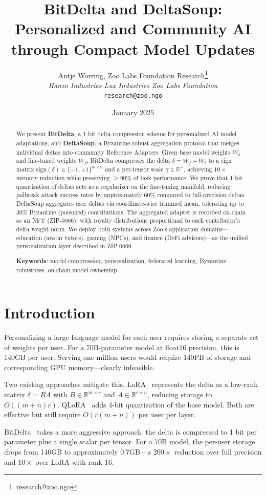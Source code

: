 \documentclass[11pt,letterpaper]{article}
\title{\textbf{BitDelta and DeltaSoup: Personalized and Community AI\\through Compact Model Updates}}
\author{
Antje Worring, Zoo Labs Foundation Research\thanks{research@zoo.ngo}\\
\textit{Hanzo Industries \quad Lux Industries \quad Zoo Labs Foundation}\\
\texttt{research@zoo.ngo}
}
\date{January 2025}
\newcommand{\R}{\mathbb{R}}
\begin{document}
\zoocoverpage

\begin{abstract}
We present \textbf{BitDelta}, a 1-bit delta compression scheme for personalized AI model adaptations, and \textbf{DeltaSoup}, a Byzantine-robust aggregation protocol that merges individual deltas into community Reference Adapters. Given base model weights $W_b$ and fine-tuned weights $W_f$, BitDelta compresses the delta $\delta = W_f - W_b$ to a sign matrix $\text{sign}(\delta) \in \{-1, +1\}^{m \times n}$ and a per-tensor scale $\gamma \in \R^+$, achieving $10\times$ memory reduction while preserving $\geq 90\%$ of task performance. We prove that 1-bit quantization of deltas acts as a regularizer on the fine-tuning manifold, reducing jailbreak attack success rates by approximately 60\% compared to full-precision deltas. DeltaSoup aggregates user deltas via coordinate-wise trimmed mean, tolerating up to 30\% Byzantine (poisoned) contributions. The aggregated adapter is recorded on-chain as an NFT (ZIP-0006), with royalty distributions proportional to each contributor's delta weight norm. We deploy both systems across Zoo's application domains---education (avatar tutors), gaming (NPCs), and finance (DeFi advisors)---as the unified personalization layer described in ZIP-0009.

\textbf{Keywords}: model compression, personalization, federated learning, Byzantine robustness, on-chain model ownership
\end{abstract}

\section{Introduction}

Personalizing a large language model for each user requires storing a separate set of weights per user. For a 70B-parameter model at float16 precision, this is 140GB per user. Serving one million users would require 140PB of storage and corresponding GPU memory---clearly infeasible.

Two existing approaches mitigate this. LoRA~\cite{hu2022lora} represents the delta as a low-rank matrix $\delta = BA$ with $B \in \R^{m \times r}$ and $A \in \R^{r \times n}$, reducing storage to $O((m+n)r)$. QLoRA~\cite{dettmers2024qlora} adds 4-bit quantization of the base model. Both are effective but still require $O(r(m+n))$ per user per layer.

BitDelta~\cite{liu2024bitdelta} takes a more aggressive approach: the delta is compressed to 1 bit per parameter plus a single scalar per tensor. For a 70B model, the per-user storage drops from 140GB to approximately 0.7GB---a $200\times$ reduction over full precision and $10\times$ over LoRA with rank 16.
\end{document}
